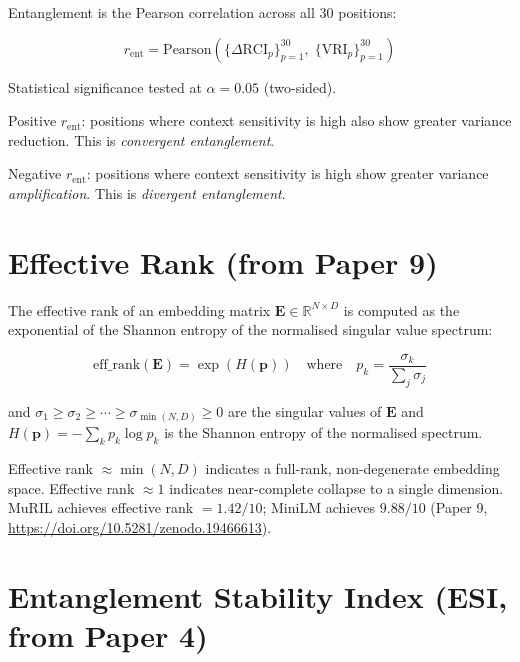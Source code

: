 \documentclass[11pt,a4paper]{article}
\begin{document}
Entanglement is the Pearson correlation across all 30 positions:

\begin{equation}
    r_{\text{ent}} = \text{Pearson}\!\left(
    \{\Delta\text{RCI}_p\}_{p=1}^{30},\;
    \{\text{VRI}_p\}_{p=1}^{30}
    \right)
\end{equation}

Statistical significance tested at $\alpha = 0.05$ (two-sided).

Positive $r_{\text{ent}}$: positions where context sensitivity is high also show
greater variance reduction. This is \emph{convergent entanglement}.

Negative $r_{\text{ent}}$: positions where context sensitivity is high show greater
variance \emph{amplification}. This is \emph{divergent entanglement}.

\section{Effective Rank (from Paper 9)}

The effective rank of an embedding matrix $\mathbf{E} \in \mathbb{R}^{N \times D}$
is computed as the exponential of the Shannon entropy of the normalised singular
value spectrum:

\begin{equation}
    \text{eff\_rank}(\mathbf{E}) = \exp\!\left(H(\mathbf{p})\right)
    \quad \text{where} \quad
    p_k = \frac{\sigma_k}{\sum_j \sigma_j}
\end{equation}

and $\sigma_1 \geq \sigma_2 \geq \cdots \geq \sigma_{\min(N,D)} \geq 0$ are the
singular values of $\mathbf{E}$ and $H(\mathbf{p}) = -\sum_k p_k \log p_k$ is the
Shannon entropy of the normalised spectrum.

Effective rank $\approx \min(N,D)$ indicates a full-rank, non-degenerate embedding
space. Effective rank $\approx 1$ indicates near-complete collapse to a single
dimension. MuRIL achieves effective rank $= 1.42/10$; MiniLM achieves $9.88/10$
(Paper 9, \url{https://doi.org/10.5281/zenodo.19466613}).

\section{Entanglement Stability Index (ESI, from Paper 4)}
\label{sec:esi}
\end{document}
